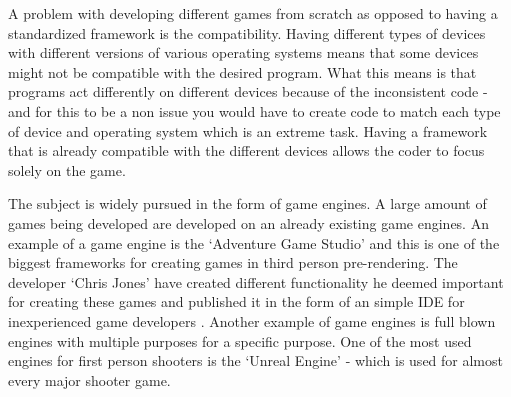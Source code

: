 A problem with developing different games from scratch as opposed to having a standardized framework is the compatibility. Having different types of devices with different versions of various operating systems means that some devices might not be compatible with the desired program. What this means is that programs act differently on different devices because of the inconsistent code - and for this to be a non issue you would have to create code to match each type of device and operating system which is an extreme task. Having a framework that is already compatible with the different devices allows the coder to focus solely on the game.

The subject is widely pursued in the form of game engines. A large amount of games being developed are developed on an already existing game engines. An example of a game engine is the `Adventure Game Studio' and this is one of the biggest frameworks for creating games in third person pre-rendering. The developer `Chris Jones' have created different functionality he deemed important for creating these games and published it in the form of an simple IDE for inexperienced game developers \cite{adv-game}. Another example of game engines is full blown engines with multiple purposes for a specific purpose. One of the most used engines for first person shooters is the `Unreal Engine' - which is used for almost every major shooter game.









